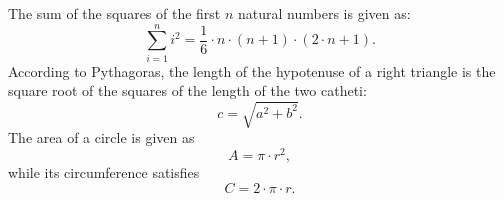 \documentclass{article}
\begin{document}
The sum of the squares of the first $n$ natural numbers is given as:
$$ \sum_{i=1}^{n} i^{2} = \frac{1}{6} \cdot n \cdot (n+1) \cdot (2\cdot n + 1). $$
According to Pythagoras, the length of the hypotenuse of a right triangle is
the square root of the squares of the length of the two catheti:
$$ c = \sqrt{a^{2} + b^{2}}.  $$
The area of a circle is given as 
$$  A = \pi \cdot r^{2},   $$ 
while its circumference satisfies
$$ C = 2 \cdot \pi \cdot r.  $$
\end{document}
